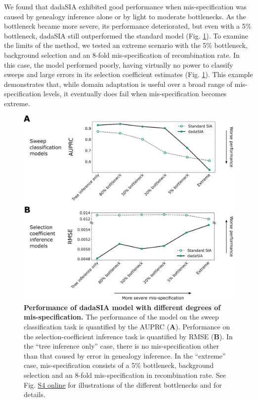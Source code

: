 We found that \ac{dadaSIA} exhibited good performance when mis-specification was caused by genealogy inference alone or by light to moderate bottlenecks. As the bottleneck became more severe, its performance deteriorated, but even with a 5\% bottleneck, \ac{dadaSIA} still outperformed the standard model (Fig. \ref{fig:DA-F5}). To examine the limits of the method, we tested an extreme scenario with the 5\% bottleneck, background selection and an 8-fold mis-specification of recombination rate. In this case, the model performed poorly, having virtually no power to classify sweeps and large errors in its selection coefficient estimates (Fig. \ref{fig:DA-F5}). This example demonstrates that, while domain adaptation is useful over a broad range of mis-specification levels, it eventually does fail when mis-specification becomes extreme.

\begin{figure}
    \centering
    \includegraphics[width=\textwidth]{DA_figs/DA_F5.PNG}
    \caption[Performance of \acf{dadaSIA} model with different degrees of mis-specification.]{\textbf{Performance of \acf{dadaSIA} model with different degrees of mis-specification.} The performance of the model on the sweep classification task is quantified by the \ac{AUPRC} (\textbf{A}). Performance on the selection-coefficient inference task is quantified by \ac{RMSE} (\textbf{B}). In the “tree inference only” case, there is no mis-specification other than that caused by error in genealogy inference. In the “extreme” case, mis-specification consists of a 5\% bottleneck, background selection and an 8-fold mis-specification in recombination rate. See Fig. \href{https://journals.plos.org/plosgenetics/article?id=10.1371/journal.pgen.1011032\#sec018}{S4 online} for illustrations of the different bottlenecks and  for details.}
    \label{fig:DA-F5}
\end{figure}

